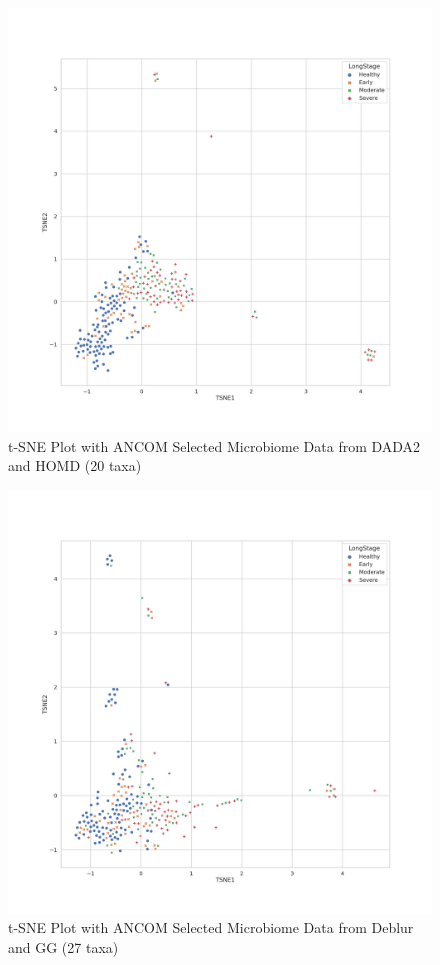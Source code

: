 \documentclass[a4paper]{article}
\begin{document}
            \begin{figure}[p]
                \centering
                \includegraphics[width=0.6 \linewidth]{figures/tSNE/ANCOM/ANCOM.DADA2.homd.png}
                \caption{t-SNE Plot with ANCOM Selected Microbiome Data from DADA2 and HOMD (20 taxa)}
                \label{fig:tsne-ANCOM-dada2-homd}
            \end{figure}

            \begin{figure}[p]
                \centering
                \includegraphics[width=0.6 \linewidth]{figures/tSNE/ANCOM/ANCOM.Deblur.gg.png}
                \caption{t-SNE Plot with ANCOM Selected Microbiome Data from Deblur and GG (27 taxa)}
                \label{fig:tsne-ANCOM-deblur-gg}
            \end{figure}
\end{document}
